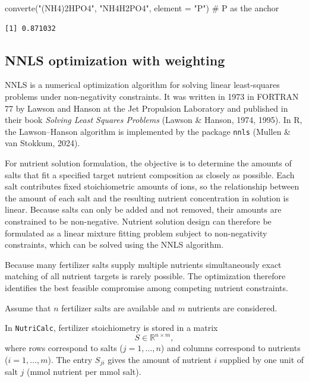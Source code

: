 \documentclass[
  letterpaper,
  DIV=11,
  numbers=noendperiod]{scrreprt}
\newenvironment{Shaded}{\begin{snugshade}}{\end{snugshade}}
\newcommand{\AttributeTok}[1]{\textcolor[rgb]{0.40,0.45,0.13}{#1}}
\newcommand{\CommentTok}[1]{\textcolor[rgb]{0.37,0.37,0.37}{#1}}
\newcommand{\FunctionTok}[1]{\textcolor[rgb]{0.28,0.35,0.67}{#1}}
\newcommand{\NormalTok}[1]{\textcolor[rgb]{0.00,0.23,0.31}{#1}}
\newcommand{\StringTok}[1]{\textcolor[rgb]{0.13,0.47,0.30}{#1}}
\begin{document}
\begin{Shaded}
\begin{Highlighting}[]
\FunctionTok{converte}\NormalTok{(}\StringTok{"(NH4)2HPO4"}\NormalTok{, }\StringTok{"NH4H2PO4"}\NormalTok{, }\AttributeTok{element =} \StringTok{"P"}\NormalTok{)  }\CommentTok{\# P as the anchor}
\end{Highlighting}
\end{Shaded}

\begin{verbatim}
[1] 0.871032
\end{verbatim}

\subsection{NNLS optimization with
weighting}\label{nnls-optimization-with-weighting}

NNLS is a numerical optimization algorithm for solving linear
least-squares problems under non-negativity constraints. It was written
in 1973 in FORTRAN 77 by Lawson and Hanson at the Jet Propulsion
Laboratory and published in their book \emph{Solving Least Squares
Problems} (Lawson \& Hanson, 1974, 1995). In R, the Lawson--Hanson
algorithm is implemented by the package \texttt{nnls} (Mullen \& van
Stokkum, 2024).

For nutrient solution formulation, the objective is to determine the
amounts of salts that fit a specified target nutrient composition as
closely as possible. Each salt contributes fixed stoichiometric amounts
of ions, so the relationship between the amount of each salt and the
resulting nutrient concentration in solution is linear. Because salts
can only be added and not removed, their amounts are constrained to be
non-negative. Nutrient solution design can therefore be formulated as a
linear mixture fitting problem subject to non-negativity constraints,
which can be solved using the NNLS algorithm.

Because many fertilizer salts supply multiple nutrients simultaneously
exact matching of all nutrient targets is rarely possible. The
optimization therefore identifies the best feasible compromise among
competing nutrient constraints.

Assume that \(n\) fertilizer salts are available and \(m\) nutrients are
considered.

In \texttt{NutriCalc}, fertilizer stoichiometry is stored in a matrix \[
S \in \mathbb{R}^{n \times m},
\] where rows correspond to salts (\(j = 1,\ldots,n\)) and columns
correspond to nutrients (\(i = 1,\ldots,m\)). The entry \(S_{j i}\)
gives the amount of nutrient \(i\) supplied by one unit of salt \(j\)
(mmol nutrient per mmol salt).
\end{document}
